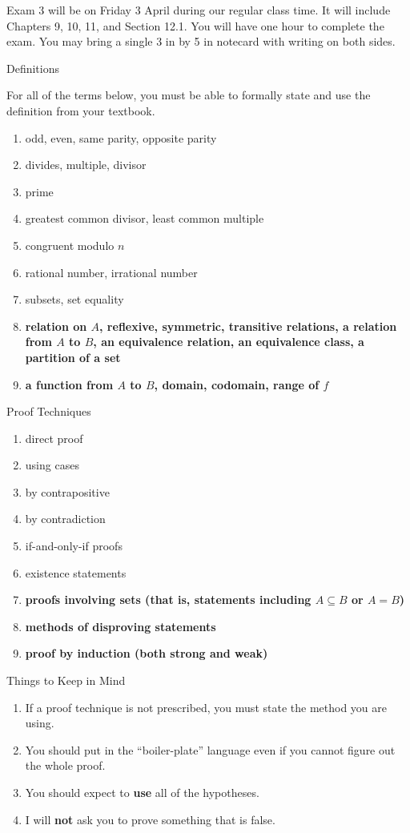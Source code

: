 \documentclass[12pt]{article}
\renewcommand{\emph}[1]{\textsf{\textbf{#1}}}
\newcommand{\be}{\begin{enumerate}}
\newcommand{\ee}{\end{enumerate}}
\begin{document}
\thispagestyle{fancy}

Exam 3 will be on Friday 3 April during our regular class time. It will include Chapters 9, 10, 11, and Section 12.1.  You will have one hour to complete the exam. You may bring a single 3 in by 5 in notecard with writing on both sides.\\

\begin{center} Definitions \end{center}

For all of the terms below, you must be able to formally state and use the definition from your textbook. 
\be
\item odd, even, same parity, opposite parity
\item divides, multiple, divisor
\item prime
\item greatest common divisor, least common multiple
\item congruent modulo $n$
\item rational number, irrational number
\item subsets, set equality
\item \textbf{relation on $A$, reflexive, symmetric, transitive relations, a relation from $A$ to $B$, an equivalence relation, an equivalence class, a partition of a set}
\item \textbf{a function from $A$ to $B$, domain, codomain, range of $f$}
\ee

\begin{center} Proof Techniques \end{center}
\be
\item direct proof
\item using cases
\item by contrapositive
\item by contradiction
\item if-and-only-if proofs
\item existence statements
\item \textbf{proofs involving sets (that is, statements including $A \subseteq B$ or $A=B$)}
\item \textbf{methods of disproving statements}
\item \textbf{proof by induction (both strong and weak)}
\ee

\newpage
\begin{center} Things to Keep in Mind \end{center}
\be
\item If a proof technique is not prescribed, you must state the method you are using.
\item You should put in the ``boiler-plate'' language even if you cannot figure out the whole proof.
\item You should expect to \emph{use} all of the hypotheses.
\item I will \emph{not} ask you to prove something that is false.
\ee
\end{document}
